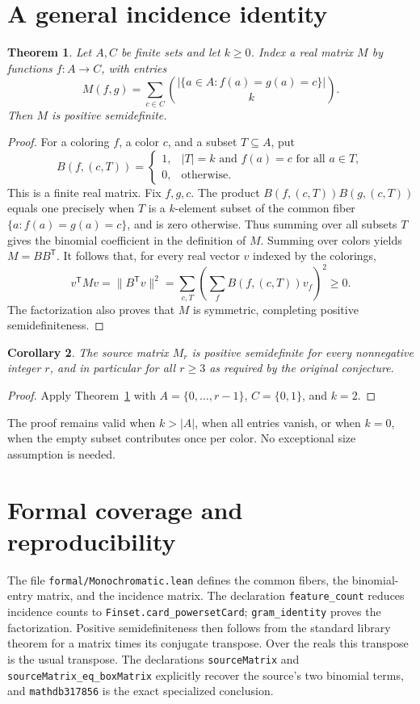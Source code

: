 \documentclass[11pt]{article}
\newtheorem{theorem}{Theorem}
\newtheorem{corollary}[theorem]{Corollary}
\begin{document}
\section{A general incidence identity}
\begin{theorem}\label{thm:gram}
Let $A,C$ be finite sets and let $k\ge0$. Index a real matrix $M$ by functions $f:A\to C$, with entries
\[
M(f,g)=\sum_{c\in C}\binom{|\{a\in A:f(a)=g(a)=c\}|}{k}.
\]
Then $M$ is positive semidefinite.
\end{theorem}
\begin{proof}
For a coloring $f$, a color $c$, and a subset $T\subseteq A$, put
\[
B(f,(c,T))=
\begin{cases}
1,& |T|=k\text{ and }f(a)=c\text{ for all }a\in T,\\
0,&\text{otherwise}.
\end{cases}
\]
This is a finite real matrix. Fix $f,g,c$. The product
$B(f,(c,T))B(g,(c,T))$ equals one precisely when $T$ is a $k$-element subset of the common fiber $\{a:f(a)=g(a)=c\}$, and is zero otherwise. Thus summing over all subsets $T$ gives the binomial coefficient in the definition of $M$. Summing over colors yields $M=BB^{\mathsf T}$. It follows that, for every real vector $v$ indexed by the colorings,
\[
v^{\mathsf T}Mv=\|B^{\mathsf T}v\|^2
 =\sum_{c,T}\left(\sum_fB(f,(c,T))v_f\right)^2\ge0.
\]
The factorization also proves that $M$ is symmetric, completing positive semidefiniteness.
\end{proof}
\begin{corollary}
The source matrix $M_r$ is positive semidefinite for every nonnegative integer $r$, and in particular for all $r\ge3$ as required by the original conjecture.
\end{corollary}
\begin{proof}
Apply Theorem~\ref{thm:gram} with $A=\{0,\ldots,r-1\}$, $C=\{0,1\}$, and $k=2$.
\end{proof}
The proof remains valid when $k>|A|$, when all entries vanish, or when $k=0$, when the empty subset contributes once per color. No exceptional size assumption is needed.
\section{Formal coverage and reproducibility}
The file \texttt{formal/Monochromatic.lean} defines the common fibers, the binomial-entry matrix, and the incidence matrix. The declaration \texttt{feature\_count} reduces incidence counts to \texttt{Finset.card\_powersetCard}; \texttt{gram\_identity} proves the factorization. Positive semidefiniteness then follows from the standard library theorem for a matrix times its conjugate transpose. Over the reals this transpose is the usual transpose. The declarations \texttt{sourceMatrix} and \texttt{sourceMatrix\_eq\_boxMatrix} explicitly recover the source's two binomial terms, and \texttt{mathdb317856} is the exact specialized conclusion.
\end{document}
